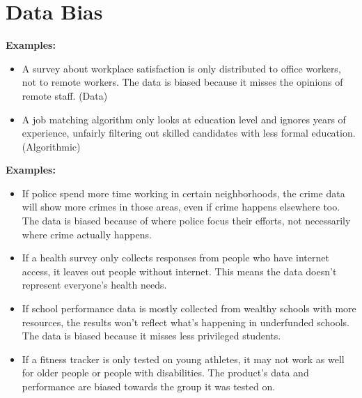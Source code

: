 \documentclass{article}
\begin{document}
\newpage
\section{Data Bias}



\textbf{Examples:}
\begin{itemize}
    \item A survey about workplace satisfaction is only distributed to office workers, not to remote workers. The data is biased because it misses the opinions of remote staff. (Data)
    \item A job matching algorithm only looks at education level and ignores years of experience, unfairly filtering out skilled candidates with less formal education. (Algorithmic)
\end{itemize}



\textbf{Examples:}
\begin{itemize}
    \item If police spend more time working in certain neighborhoods, the crime data will show more crimes in those areas, even if crime happens elsewhere too. The data is biased because of where police focus their efforts, not necessarily where crime actually happens.
    \item If a health survey only collects responses from people who have internet access, it leaves out people without internet. This means the data doesn’t represent everyone’s health needs.
    \item If school performance data is mostly collected from wealthy schools with more resources, the results won’t reflect what’s happening in underfunded schools. The data is biased because it misses less privileged students.
    \item If a fitness tracker is only tested on young athletes, it may not work as well for older people or people with disabilities. The product’s data and performance are biased towards the group it was tested on.
\end{itemize}
\end{document}
